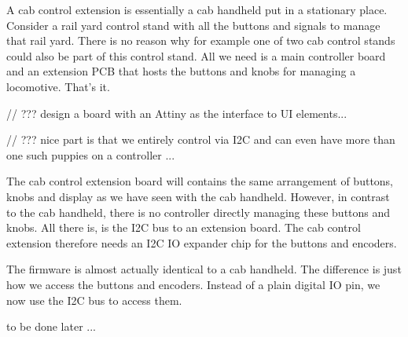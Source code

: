 
A cab control extension is essentially a cab handheld put in a stationary place. Consider a rail yard control stand with all the buttons and signals to manage that rail yard. There is no reason why for example one of two cab control stands could also be part of this control stand. All we need is a main controller board and an extension PCB that hosts the buttons and knobs for managing a locomotive. That's it.

// ??? design a board with an Attiny as the interface to UI elements...

// ??? nice part is that we entirely control via I2C and can even have more than one such puppies on a controller ...


The cab control extension board will contains the same arrangement of buttons, knobs and display as we have seen with the cab handheld. However, in contrast to the cab handheld, there is no controller directly managing these buttons and knobs. All there is, is the I2C bus to an extension board. The cab control extension therefore needs an I2C IO expander chip for the buttons and encoders.






The firmware is almost actually identical to a cab handheld. The difference is just how we access the buttons and encoders. Instead of a plain digital IO pin, we now use the I2C bus to access them.


to be done later ...
